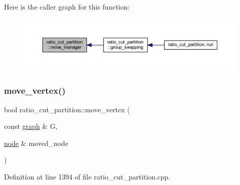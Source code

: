 Here is the caller graph for this function\+:\nopagebreak
\begin{figure}[H]
\begin{center}
\leavevmode
\includegraphics[width=350pt]{classratio__cut__partition_a16997844577ee3284a2b6fddbbea8c37_icgraph}
\end{center}
\end{figure}
\mbox{\label{classratio__cut__partition_a2dbe8b4e73ac88fe6a9a2403ca35eb3f}} 
\subsubsection{\texorpdfstring{move\+\_\+vertex()}{move\_vertex()}}
{\footnotesize\ttfamily bool ratio\+\_\+cut\+\_\+partition\+::move\+\_\+vertex (\begin{DoxyParamCaption}\item[{const \mbox{\hyperlink{classgraph}{graph}} \&}]{G,  }\item[{\mbox{\hyperlink{classnode}{node}} \&}]{moved\+\_\+node }\end{DoxyParamCaption})\hspace{0.3cm}{\ttfamily [protected]}}



Definition at line 1394 of file ratio\+\_\+cut\+\_\+partition.\+cpp.


